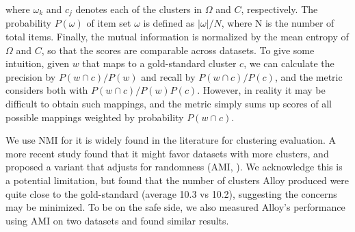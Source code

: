where $\omega_k$ and $c_j$ denotes each of the clusters in $\Omega$ and $C$,
respectively. The probability $P(\omega)$ of item set $\omega$ is defined as
$|\omega|/N$, where N is the number of total items. Finally, the mutual
information is normalized by the mean entropy of $\Omega$ and $C$, so that the
scores are comparable across datasets.
To give some intuition, given $w$ that maps to a gold-standard
cluster $c$, we can calculate the precision by $P(w \cap c) / P(w)$ and recall
by $P(w \cap c)/P(c)$, and the metric considers both with $P(w \cap c)/P(w)P(c)$.
However, in reality it may be difficult to obtain such mappings, and the metric simply
sums up scores of all possible mappings weighted by probability $P(w \cap c)$.

We use NMI for it is widely found in the literature for clustering evaluation.
A more recent study found that it might favor datasets with more clusters, and
proposed a variant that adjusts for randomness (AMI,
\cite{vinh2009information}).  We acknowledge this is a potential limitation,
but found that the number of clusters Alloy produced were quite close to the
gold-standard (average 10.3 vs 10.2), suggesting the concerns may be minimized.
To be on the safe side, we also measured Alloy's performance using AMI on two
datasets and found similar results. 




